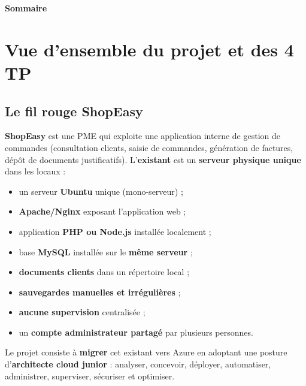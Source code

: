 \documentclass[11pt,a4paper]{article}
\begin{document}
\thispagestyle{fancy}
{\sffamily\Huge\bfseries\color{azuredark}Sommaire}
\vspace{2mm}{\color{azure}\titlerule[1.6pt]}\vspace{4mm}
\hypersetup{linkcolor=azuredark}
{\setlength{\parskip}{1pt}\tableofcontents}
\newpage

\setcounter{section}{-1}

\section{Vue d'ensemble du projet et des 4 TP}

\subsection{Le fil rouge ShopEasy}

\textbf{ShopEasy} est une PME qui exploite une application interne de gestion de commandes (consultation clients, saisie de commandes, génération de factures, dépôt de documents justificatifs). L'\textbf{existant} est un \textbf{serveur physique unique} dans les locaux :

\begin{itemize}
\item un serveur \textbf{Ubuntu} unique (mono-serveur) ;
\item \textbf{Apache/Nginx} exposant l'application web ;
\item application \textbf{PHP ou Node.js} installée localement ;
\item base \textbf{MySQL} installée sur le \textbf{même serveur} ;
\item \textbf{documents clients} dans un répertoire local ;
\item \textbf{sauvegardes manuelles et irrégulières} ;
\item \textbf{aucune supervision} centralisée ;
\item un \textbf{compte administrateur partagé} par plusieurs personnes.
\end{itemize}

Le projet consiste à \textbf{migrer} cet existant vers Azure en adoptant une posture d'\textbf{architecte cloud junior} : analyser, concevoir, déployer, automatiser, administrer, superviser, sécuriser et optimiser.
\end{document}

